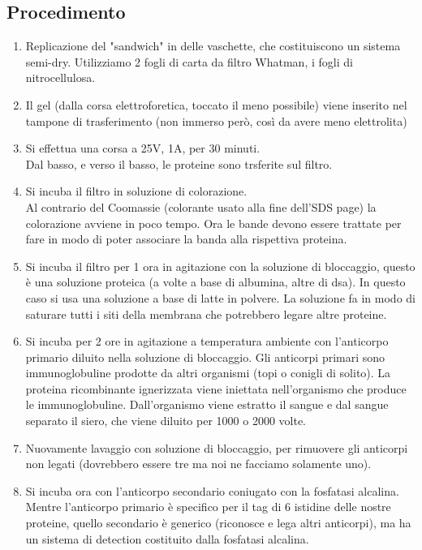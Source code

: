 \documentclass{extarticle}
\begin{document}
\subsection*{Procedimento}
\begin{enumerate}
    \item Replicazione del "sandwich" in delle vaschette, che costituiscono un sistema semi-dry. Utilizziamo 2 fogli di carta da filtro Whatman, i fogli di nitrocellulosa.
    \item Il gel (dalla corsa elettroforetica, toccato il meno possibile) viene inserito nel tampone di trasferimento (non immerso però, così da avere meno elettrolita)
    \item Si effettua una corsa a 25V, 1A, per 30 minuti.\\
    Dal basso, e verso il basso, le proteine sono trsferite sul filtro.
    \item Si incuba il filtro in soluzione di colorazione.\\
    Al contrario del Coomassie (colorante usato alla fine dell'SDS page) la colorazione avviene in poco tempo. Ora le bande devono essere trattate per fare in modo di poter associare la banda alla rispettiva proteina.
    \item Si incuba il filtro per 1 ora in agitazione con la soluzione di bloccaggio, questo è una soluzione proteica (a volte a base di albumina, altre di dsa). In questo caso si usa una soluzione a base di latte in polvere. La soluzione fa in modo di saturare tutti i siti della membrana che potrebbero legare altre proteine.
    \item Si incuba per 2 ore in agitazione a temperatura ambiente con l'anticorpo primario diluito nella soluzione di bloccaggio. Gli anticorpi primari sono immunoglobuline prodotte da altri organismi (topi o conigli di solito). La proteina ricombinante ignerizzata viene iniettata nell'organismo che produce le immunoglobuline. Dall'organismo viene estratto il sangue e dal sangue separato il siero, che viene diluito per 1000 o 2000 volte.
    \item Nuovamente lavaggio con soluzione di bloccaggio, per rimuovere gli anticorpi non legati (dovrebbero essere tre ma noi ne facciamo solamente uno).
    \item Si incuba ora con l'anticorpo secondario coniugato con la fosfatasi alcalina.\\ Mentre l'anticorpo primario è specifico per il tag di 6 istidine delle nostre proteine, quello secondario è generico (riconosce e lega altri anticorpi), ma ha un sistema di detection costituito dalla fosfatasi alcalina.

\end{enumerate}
\end{document}
